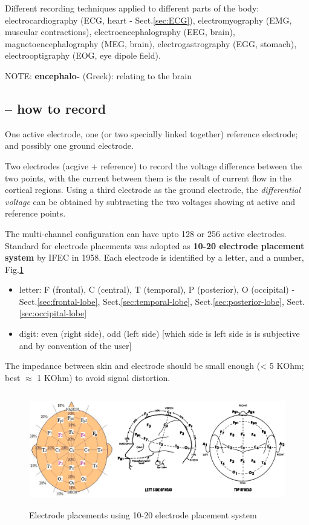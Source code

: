 \begin{mdframed}

Different recording techniques applied to different parts of the body:
electrocardiography (ECG, heart - Sect.\ref{sec:ECG}), electromyography (EMG,
muscular contractions),  electroencephalography  (EEG,  brain), 
magnetoencephalography (MEG, brain),  electrogastrography (EGG, stomach), 
electrooptigraphy  (EOG, eye dipole   field).

NOTE: {\bf encephalo-} (Greek): relating to the brain
\end{mdframed}

\subsection{-- how to record}
\label{sec:EEG-how-to-record}

One active electrode, one (or two specially linked together) reference
electrode; and possibly one ground electrode.

Two electrodes (acgive + reference) to record the voltage difference between the
two points, with the current between them is the result of current flow in the
cortical regions. Using a third electrode as the ground electrode, the {\it
differential voltage} can be obtained by subtracting the two voltages showing at
active and reference points.

The multi-channel configuration can have upto 128 or 256 active electrodes.
Standard for electrode placements was adopted as {\bf 10-20 electrode placement
system} by IFEC in 1958. Each electrode is identified by a letter, and a number,
Fig.\ref{fig:EEG_electrode-placement}

\begin{itemize}
  \item letter: F (frontal), C (central), T (temporal), P (posterior), O
  (occipital) - Sect.\ref{sec:frontal-lobe}, Sect.\ref{sec:temporal-lobe},
  Sect.\ref{sec:posterior-lobe}, Sect.\ref{sec:occipital-lobe}
  
  \item digit: even (right side), odd (left side)   [which side is left side is
  is subjective and by convention of the user]
\end{itemize}

The impedance between skin and electrode should be small enough (< 5 KOhm; best
$\approx$ 1 KOhm) to avoid signal distortion.

\begin{figure}[hbt]
  \centerline{\includegraphics[height=5cm,
    angle=0]{./images/EEG_electrode-placement.eps}}
  \caption{Electrode placements using 10-20 electrode placement system}
\label{fig:EEG_electrode-placement}
\end{figure}

